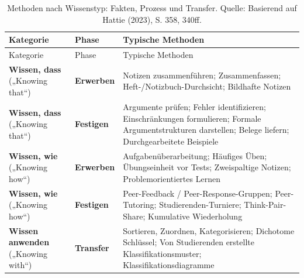 \documentclass[
  ngerman,
  letterpaper,
  DIV=11]{scrreprt}
\begin{document}
\begin{longtable}[]{@{}
  >{\raggedright\arraybackslash}p{}
  >{\raggedright\arraybackslash}p{}
  >{\raggedright\arraybackslash}p{}@{}}
\caption{Methoden nach Wissenstyp: Fakten, Prozess und Transfer. Quelle:
Basierend auf Hattie (2023), S. 358,
340ff.}\label{tbl-wissenstypen}\tabularnewline
\toprule\noalign{}
\begin{minipage}[b]{\linewidth}\raggedright
Kategorie
\end{minipage} & \begin{minipage}[b]{\linewidth}\raggedright
Phase
\end{minipage} & \begin{minipage}[b]{\linewidth}\raggedright
Typische Methoden
\end{minipage} \\
\midrule\noalign{}
\endfirsthead
\toprule\noalign{}
\begin{minipage}[b]{\linewidth}\raggedright
Kategorie
\end{minipage} & \begin{minipage}[b]{\linewidth}\raggedright
Phase
\end{minipage} & \begin{minipage}[b]{\linewidth}\raggedright
Typische Methoden
\end{minipage} \\
\midrule\noalign{}
\endhead
\bottomrule\noalign{}
\endlastfoot
\textbf{Wissen, dass} („Knowing that``) & \textbf{Erwerben} & Notizen
zusammenführen; Zusammenfassen; Heft-/Notizbuch-Durchsicht; Bildhafte
Notizen \\
\textbf{Wissen, dass} („Knowing that``) & \textbf{Festigen} & Argumente
prüfen; Fehler identifizieren; Einschränkungen formulieren; Formale
Argumentstrukturen darstellen; Belege liefern; Durchgearbeitete
Beispiele \\
\textbf{Wissen, wie} („Knowing how``) & \textbf{Erwerben} &
Aufgabenüberarbeitung; Häufiges Üben; Übungseinheit vor Tests;
Zweispaltige Notizen; Problemorientiertes Lernen \\
\textbf{Wissen, wie} („Knowing how``) & \textbf{Festigen} &
Peer-Feedback / Peer-Response-Gruppen; Peer-Tutoring;
Studierenden-Turniere; Think-Pair-Share; Kumulative Wiederholung \\
\textbf{Wissen anwenden} („Knowing with``) & \textbf{Transfer} &
Sortieren, Zuordnen, Kategorisieren; Dichotome Schlüssel; Von
Studierenden erstellte Klassifikationsmuster;
Klassifikationsdiagramme \\
\end{longtable}
\end{document}

